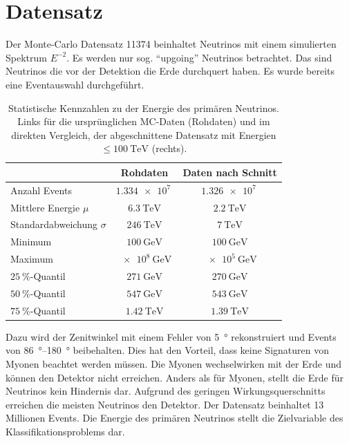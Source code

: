 \section{Datensatz}
Der Monte-Carlo Datensatz 11374 \cite{dataset} beinhaltet Neutrinos mit einem simulierten Spektrum $E^{-2}$.
Es werden nur sog. "`upgoing"'  Neutrinos betrachtet.
Das sind Neutrinos die vor der Detektion die Erde durchquert haben.
Es wurde bereits eine Eventauswahl durchgeführt.
\begin{table}
    \centering
    \caption{Statistische Kennzahlen zu der Energie des primären Neutrinos.
    Links für die ursprünglichen MC-Daten (Rohdaten) und im direkten Vergleich, der abgeschnittene Datensatz mit Energien $\leq \SI{100}{\tera\eV}$ (rechts).
    }
    \label{tab:energy_stats}
    \begin{tabular}{l|c c}
        \toprule
        & Rohdaten & Daten nach Schnitt \\
        \midrule
        Anzahl Events & $\SI{1.334e+7}{}$ & $\SI{1.326e+7}{}$\\
        Mittlere Energie $\mu$ & $\SI{6.3}{\tera\eV}$ & $\SI{2.2}{\tera\eV}$ \\
        Standardabweichung $\sigma$ & $\SI{246}{\tera\eV}$ & $\SI{7}{\tera\eV}$ \\
        Minimum & $\SI{100}{\giga\eV}$ & $\SI{100}{\giga\eV}$ \\
        Maximum & $\SI{e+8}{\giga\eV}$ & $\SI{e+5}{\giga\eV}$ \\
        $\SI{25}{\percent}$-Quantil & $\SI{271}{\giga\eV}$ & $\SI{270}{\giga\eV}$ \\ 
        $\SI{50}{\percent}$-Quantil & $\SI{547}{\giga\eV}$ & $\SI{543}{\giga\eV}$ \\ 
        $\SI{75}{\percent}$-Quantil & $\SI{1.42}{\tera\eV}$ & $\SI{1.39}{\tera\eV}$ \\ 
        \bottomrule
    \end{tabular}
\end{table}
Dazu wird der Zenitwinkel mit einem Fehler von \SI{5}{\degree} rekonstruiert und Events von \SIrange{86}{180}{\degree} beibehalten.
Dies hat den Vorteil, dass keine Signaturen von Myonen beachtet werden müssen.
Die Myonen wechselwirken mit der Erde und können den Detektor nicht erreichen.
Anders als für Myonen, stellt die Erde für Neutrinos kein Hindernis dar.
Aufgrund des geringen Wirkungsquerschnitts erreichen die meisten Neutrinos den Detektor.
Der Datensatz beinhaltet 13 Millionen Events.
Die Energie des primären Neutrinos stellt die Zielvariable des Klassifikationsproblems dar.

